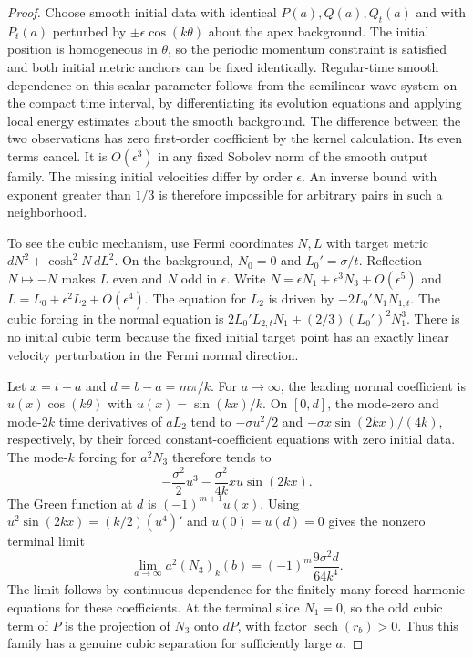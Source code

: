 \documentclass[11pt]{article}
\newcommand{\sech}{\operatorname{sech}}
\begin{document}
\begin{proof}
Choose smooth initial data with identical $P(a),Q(a),Q_t(a)$
and with $P_t(a)$ perturbed by $\pm\epsilon\cos(k\theta)$
about the apex background.
The initial position is homogeneous in $\theta$, so the periodic
momentum constraint is satisfied and both initial metric
anchors can be fixed identically.
Regular-time smooth dependence on this scalar parameter follows from
the semilinear wave system on the compact time interval,
by differentiating its evolution equations and applying local
energy estimates about the smooth background.
The difference between the two observations has zero first-order
coefficient by the kernel calculation. Its even terms cancel.
It is $O(\epsilon^3)$ in any fixed Sobolev norm of the smooth
output family. The missing initial velocities differ by order
$\epsilon$. An inverse bound with exponent greater than $1/3$
is therefore impossible for arbitrary pairs in such a neighborhood.

To see the cubic mechanism, use Fermi coordinates $N,L$
with target metric $dN^2+\cosh^2N\,dL^2$. On the background,
$N_0=0$ and $L_0'=\sigma/t$.
Reflection $N\mapsto-N$ makes $L$ even and $N$ odd in $\epsilon$.
Write $N=\epsilon N_1+\epsilon^3N_3+O(\epsilon^5)$ and
$L=L_0+\epsilon^2 L_2+O(\epsilon^4)$.
The equation for $L_2$ is driven by $-2 L_0' N_1 N_{1,t}$.
The cubic forcing in the normal equation is
$2L_0' L_{2,t}N_1+(2/3)(L_0')^2N_1^3$.
There is no initial cubic term because the fixed initial target
point has an exactly linear velocity perturbation in the
Fermi normal direction.

Let $x=t-a$ and $d=b-a=m\pi/k$.
For $a\to\infty$, the leading normal coefficient is
$u(x)\cos(k\theta)$ with $u(x)=\sin(kx)/k$.
On $[0,d]$, the mode-zero and mode-$2k$ time derivatives
of $a L_2$ tend to
$-\sigma u^2/2$ and $-\sigma x\sin(2kx)/(4k)$, respectively,
by their forced constant-coefficient equations with zero initial data.
The mode-$k$ forcing for $a^2N_3$ therefore tends to
\[
 -\frac{\sigma^2}{2}u^3
 -\frac{\sigma^2}{4k}xu\sin(2kx).
\]
The Green function at $d$ is $(-1)^{m+1}u(x)$.
Using $u^2\sin(2kx)=(k/2)(u^4)'$ and $u(0)=u(d)=0$
gives the nonzero terminal limit
\[
 \lim_{a\to\infty} a^2(N_3)_k(b)
 =(-1)^m\frac{9\sigma^2 d}{64 k^4}.
\]
The limit follows by continuous dependence for the finitely
many forced harmonic equations for these coefficients.
At the terminal slice $N_1=0$, so the odd cubic term of
$P$ is the projection of $N_3$ onto $dP$, with factor
$\sech(r_b)>0$. Thus this family has a genuine cubic separation
for sufficiently large $a$.
\end{proof}
\end{document}

